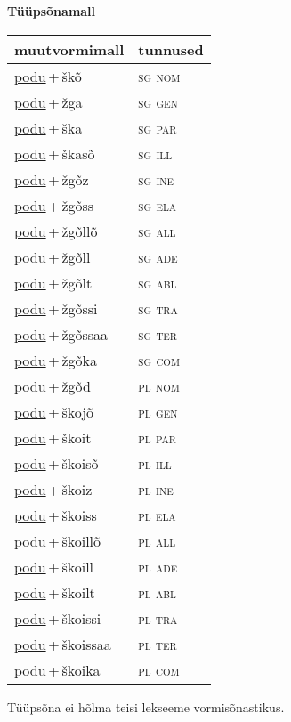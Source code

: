 
\vspace{1.8em}
\begin{minipage}{\textwidth}
\textbf{Tüüpsõnamall \,}\\

\begin{sideways}
\begin{tabular}{l l}
muutvormimall & tunnused \\
\hline
\underline{podu}\,+\,škõ & \textsc{ sg nom } \\
\underline{podu}\,+\,žga & \textsc{ sg gen } \\
\underline{podu}\,+\,ška & \textsc{ sg par } \\
\underline{podu}\,+\,škasõ & \textsc{ sg ill } \\
\underline{podu}\,+\,žgõz & \textsc{ sg ine } \\
\underline{podu}\,+\,žgõss & \textsc{ sg ela } \\
\underline{podu}\,+\,žgõllõ & \textsc{ sg all } \\
\underline{podu}\,+\,žgõll & \textsc{ sg ade } \\
\underline{podu}\,+\,žgõlt & \textsc{ sg abl } \\
\underline{podu}\,+\,žgõssi & \textsc{ sg tra } \\
\underline{podu}\,+\,žgõssaa & \textsc{ sg ter } \\
\underline{podu}\,+\,žgõka & \textsc{ sg com } \\
\underline{podu}\,+\,žgõd & \textsc{ pl nom } \\
\underline{podu}\,+\,škojõ & \textsc{ pl gen } \\
\underline{podu}\,+\,škoit & \textsc{ pl par } \\
\underline{podu}\,+\,škoisõ & \textsc{ pl ill } \\
\underline{podu}\,+\,škoiz & \textsc{ pl ine } \\
\underline{podu}\,+\,škoiss & \textsc{ pl ela } \\
\underline{podu}\,+\,škoillõ & \textsc{ pl all } \\
\underline{podu}\,+\,škoill & \textsc{ pl ade } \\
\underline{podu}\,+\,škoilt & \textsc{ pl abl } \\
\underline{podu}\,+\,škoissi & \textsc{ pl tra } \\
\underline{podu}\,+\,škoissaa & \textsc{ pl ter } \\
\underline{podu}\,+\,škoika & \textsc{ pl com } \\
\end{tabular}
\end{sideways}
\label{tab:tüüpsõnamall-poduškõ}

\end{minipage}

 
\vspace{1em}
\noindent Tüüpsõna ei hõlma teisi lekseeme vormi\-sõnastikus.
